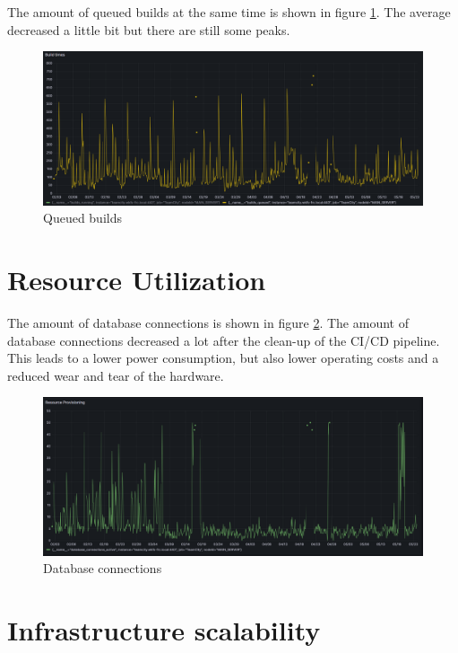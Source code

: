 The amount of queued builds at the same time is shown in figure \ref{fig:queued-builds}. The average decreased a little bit but there are still some peaks.

\begin{figure}[htbp]
    \centering
    \includegraphics[width=\textwidth]{graphics/builds queued.png}
    \caption{Queued builds}
    \label{fig:queued-builds}
\end{figure}

\section{Resource Utilization}%
\label{sec:resource-utilization}

The amount of database connections is shown in figure \ref{fig:db-connections}. The amount of database connections decreased a lot after the clean-up of the CI/CD pipeline.
This leads to a lower power consumption, but also lower operating costs and a reduced wear and tear of the hardware.

\begin{figure}[htbp]
    \centering
    \includegraphics[width=\textwidth]{graphics/DB connections.png}
    \caption{Database connections}
    \label{fig:db-connections}
\end{figure}

\section{Infrastructure scalability}%
\label{sec:infrastructure-scalability}

